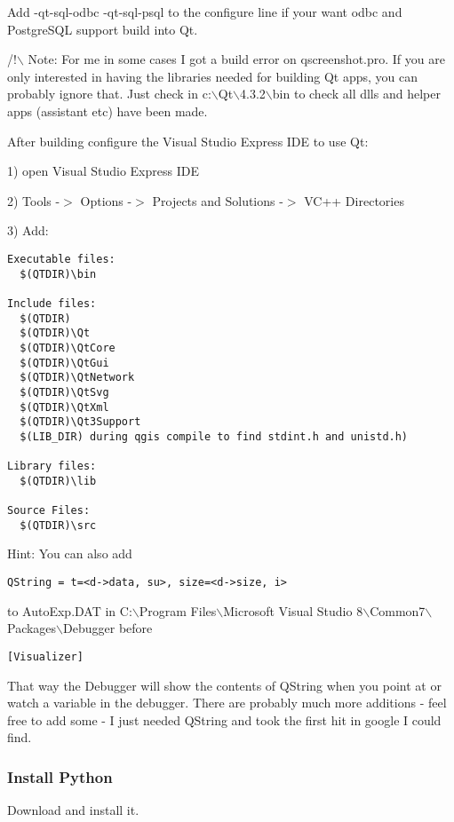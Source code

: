Add -qt-sql-odbc -qt-sql-psql to the configure line if your want odbc and
PostgreSQL support build into Qt.

/!$\backslash$ Note: For me in some cases I got a build error on qscreenshot.pro. If you
are only interested in having the libraries needed for building Qt apps, you 
can probably ignore that. Just check in c:$\backslash$Qt$\backslash$4.3.2$\backslash$bin to check all dlls and 
helper apps (assistant etc) have been made.

After building configure the Visual Studio Express IDE to use Qt:

1) open Visual Studio Express IDE

2) Tools -$>$ Options -$>$ Projects and Solutions -$>$ VC++ Directories

3) Add:

\begin{verbatim}
Executable files: 
  $(QTDIR)\bin

Include files: 
  $(QTDIR)
  $(QTDIR)\Qt
  $(QTDIR)\QtCore
  $(QTDIR)\QtGui
  $(QTDIR)\QtNetwork
  $(QTDIR)\QtSvg
  $(QTDIR)\QtXml
  $(QTDIR)\Qt3Support
  $(LIB_DIR) during qgis compile to find stdint.h and unistd.h)

Library files: 
  $(QTDIR)\lib

Source Files:
  $(QTDIR)\src
\end{verbatim}

Hint:  You can also add

\begin{verbatim}
QString = t=<d->data, su>, size=<d->size, i>
\end{verbatim}

to AutoExp.DAT in C:$\backslash$Program Files$\backslash$Microsoft Visual Studio 8$\backslash$Common7$\backslash$Packages$\backslash$Debugger before 

\begin{verbatim}
[Visualizer]
\end{verbatim}

That way the Debugger will show the contents of QString when you point at or
watch a variable in the debugger.  There are probably much more additions -
feel free to add some - I just needed QString and took the first hit in google
I could find.

\subsubsection{Install Python}
Download  and install it.

